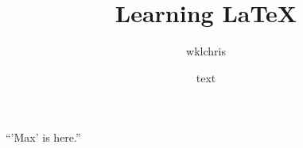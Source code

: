 \documentclass[a4paper]{article}
\title{Learning LaTeX}
\author{wklchris}
\date{text}
\begin{document}
``\thinspace'Max' is here.''
\end{document}
